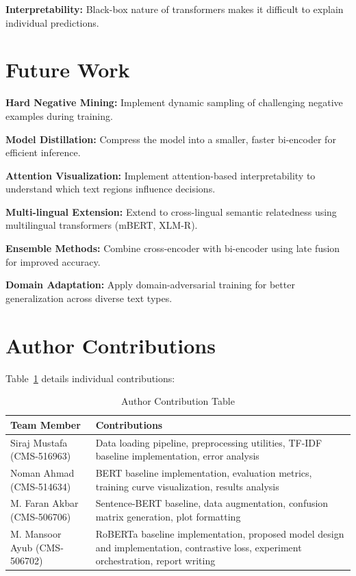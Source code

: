\documentclass[conference]{IEEEtran}
\begin{document}
\textbf{Interpretability:} Black-box nature of transformers makes it difficult to explain individual predictions.

\section{Future Work}

\textbf{Hard Negative Mining:} Implement dynamic sampling of challenging negative examples during training.

\textbf{Model Distillation:} Compress the model into a smaller, faster bi-encoder for efficient inference.

\textbf{Attention Visualization:} Implement attention-based interpretability to understand which text regions influence decisions.

\textbf{Multi-lingual Extension:} Extend to cross-lingual semantic relatedness using multilingual transformers (mBERT, XLM-R).

\textbf{Ensemble Methods:} Combine cross-encoder with bi-encoder using late fusion for improved accuracy.

\textbf{Domain Adaptation:} Apply domain-adversarial training for better generalization across diverse text types.

\section{Author Contributions}

Table~\ref{tab:contributions} details individual contributions:

\begin{table}[h]
\caption{Author Contribution Table}
\label{tab:contributions}
\centering
\small
\begin{tabular}{p{2.5cm}p{5.2cm}}
\toprule
\textbf{Team Member} & \textbf{Contributions} \\
\midrule
Siraj Mustafa \newline (CMS-516963) & Data loading pipeline, preprocessing utilities, TF-IDF baseline implementation, error analysis \\
\midrule
Noman Ahmad \newline (CMS-514634) & BERT baseline implementation, evaluation metrics, training curve visualization, results analysis \\
\midrule
M. Faran Akbar \newline (CMS-506706) & Sentence-BERT baseline, data augmentation, confusion matrix generation, plot formatting \\
\midrule
M. Mansoor Ayub \newline (CMS-506702) & RoBERTa baseline implementation, proposed model design and implementation, contrastive loss, experiment orchestration, report writing \\
\bottomrule
\end{tabular}
\end{table}
\end{document}

